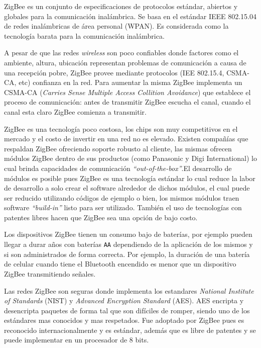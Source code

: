 \documentclass[10pt,journal,compsoc]{IEEEtran}
\begin{document}
ZigBee es  un conjunto de especificaciones de protocolos estándar, abiertos y globales para la comunicación inalámbrica. Se basa en el estándar IEEE 802.15.04 de redes inalámbricas de área personal (WPAN). Es considerada como la tecnología barata para la comunicación inalámbrica.

A pesar de que las redes \emph{wireless} son poco confiables donde factores como el ambiente, altura, ubicación representan problemas de comunicación a causa de una recepción pobre, ZigBee provee mediante protocolos (IEE 802.15.4, CSMA-CA, etc) confianza en la red. Para aumentar la misma ZigBee implementa un CSMA-CA (\emph{Carries Sense Multiple Access Collition Avoidance}) que establece el proceso de comunicación: antes de transmitir ZigBee escucha el canal, cuando el canal esta claro ZigBee comienza a transmitir.

ZigBee es una tecnología poco costosa, los chips son muy competitivos en el mercado y el costo de invertir en una red no es elevado. Existen compañías \cite{bombal} que respaldan ZigBee ofreciendo soporte robusto al cliente, las mismas ofrecen módulos ZigBee dentro de sus productos (como Panasonic y Digi International) lo cual brinda capacidades de comunicación \emph{``out-of-the-box''}.El desarrollo de módulos es posible pues ZigBee es una tecnología estándar lo cual reduce la labor de desarrollo a solo crear el software alrededor de dichos módulos, el cual puede ser reducido utilizando códigos de ejemplo o bien, los mismos módulos traen software \emph{``build-in''} listo para ser utilizado. También el uso de tecnologías con patentes libres hacen que  ZigBee sea una opción de bajo costo.

Los dispositivos ZigBee tienen un consumo bajo de baterías, por ejemplo pueden llegar a durar años con baterías \texttt{AA} dependiendo de la aplicación de los mismos y si son administrados de forma correcta. Por ejemplo, la duración de una batería de celular cuando tiene el Bluetooth encendido es menor que un dispositivo ZigBee transmitiendo señales. 

Las redes ZigBee son seguras donde implementa los estandares \emph{National Institute of Standards} (NIST) y \emph{Advanced Encryption Standard} (AES). AES encripta y desencripta paquetes de forma tal que son difíciles de romper, siendo uno de los estándares mas conocidos y mas respetados. Fue adoptado por ZigBee pues es reconocido internacionalmente y es estándar, además que es libre de patentes y se puede implementar en un procesador de 8 bits. 
\end{document}
